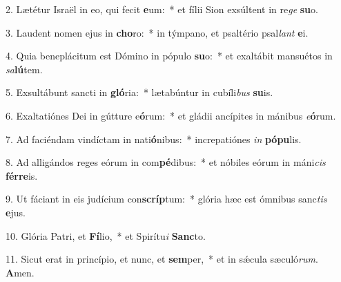 2. Lætétur Israël in eo, qui fecit \textbf{e}um:~*  et fílii Sion exsúltent in re\textit{ge} \textbf{su}o.\

3. Laudent nomen ejus in \textbf{cho}ro:~*  in týmpano, et psaltério psal\textit{lant} \textbf{e}i.\

4. Quia beneplácitum est Dómino in pópulo \textbf{su}o:~*  et exaltábit mansuétos in \textit{sa}\textbf{lú}tem.\

5. Exsultábunt sancti in \textbf{gló}ria:~*  lætabúntur in cubíli\textit{bus} \textbf{su}is.\

6. Exaltatiónes Dei in gútture e\textbf{ó}rum:~*  et gládii ancípites in mánibus \textit{e}\textbf{ó}rum.\

7. Ad faciéndam vindíctam in nati\textbf{ó}nibus:~*  increpatiónes \textit{in} \textbf{pó}\textbf{pu}lis.\

8. Ad alligándos reges eórum in com\textbf{pé}dibus:~*  et nóbiles eórum in máni\textit{cis} \textbf{fér}\textbf{re}is.\

9. Ut fáciant in eis judícium con\textbf{scríp}tum:~*  glória hæc est ómnibus sanc\textit{tis} \textbf{e}jus.\

10. Glória Patri, et \textbf{Fí}lio,~*  et Spirítu\textit{i} \textbf{Sanc}to.\

11. Sicut erat in princípio, et nunc, et \textbf{sem}per,~*  et in sǽcula sæculó\textit{rum}. \textbf{A}men.\

